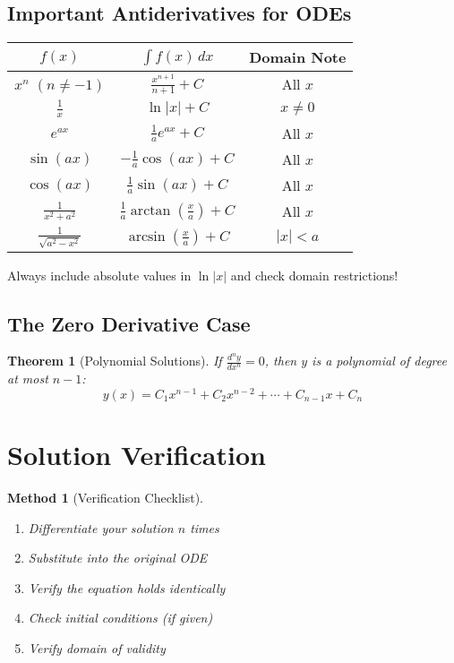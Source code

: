 \documentclass[12pt]{article}
\newtheorem{theorem}{Theorem}
\newtheorem{method}{Method}
\begin{document}
\subsection{Important Antiderivatives for ODEs}

\begin{center}
\begin{tabular}{|c|c|c|}
\hline
\textbf{$f(x)$} & \textbf{$\int f(x)\,dx$} & \textbf{Domain Note} \\
\hline
$x^n$ $(n \neq -1)$ & $\frac{x^{n+1}}{n+1} + C$ & All $x$ \\
\hline
$\frac{1}{x}$ & $\ln|x| + C$ & $x \neq 0$ \\
\hline
$e^{ax}$ & $\frac{1}{a}e^{ax} + C$ & All $x$ \\
\hline
$\sin(ax)$ & $-\frac{1}{a}\cos(ax) + C$ & All $x$ \\
\hline
$\cos(ax)$ & $\frac{1}{a}\sin(ax) + C$ & All $x$ \\
\hline
$\frac{1}{x^2 + a^2}$ & $\frac{1}{a}\arctan\left(\frac{x}{a}\right) + C$ & All $x$ \\
\hline
$\frac{1}{\sqrt{a^2 - x^2}}$ & $\arcsin\left(\frac{x}{a}\right) + C$ & $|x| < a$ \\
\hline
\end{tabular}
\end{center}

\begin{warning}
Always include absolute values in $\ln|x|$ and check domain restrictions!
\end{warning}

\subsection{The Zero Derivative Case}

\begin{theorem}[Polynomial Solutions]
If $\frac{d^n y}{dx^n} = 0$, then $y$ is a polynomial of degree at most $n-1$:
$$y(x) = C_1 x^{n-1} + C_2 x^{n-2} + \cdots + C_{n-1}x + C_n$$
\end{theorem}

\section{Solution Verification}

\begin{method}[Verification Checklist]
\begin{enumerate}
    \item Differentiate your solution $n$ times
    \item Substitute into the original ODE
    \item Verify the equation holds identically
    \item Check initial conditions (if given)
    \item Verify domain of validity
\end{enumerate}
\end{method}
\end{document}
